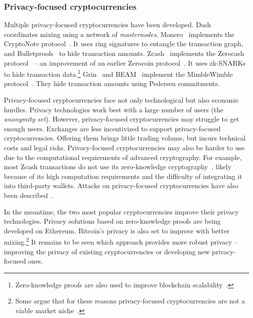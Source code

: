\subsubsection*{Privacy-focused cryptocurrencies}

Multiple privacy-focused cryptocurrencies have been developed.
Dash~\cite{Dash} coordinates mixing using a network of \textit{masternodes}.
Monero~\cite{Monero} implements the CryptoNote protocol~\cite{Saberhagen2013}.
It uses ring signatures to entangle the transaction graph, and Bulletproofs~\cite{Buenz2018} to hide transaction amounts.
Zcash~\cite{Zcash} implements the Zerocash protocol~\cite{BenSasson2014, Hopwood2020} -- an improvement of an earlier Zerocoin protocol~\cite{Miers2013}.
It uses zk-SNARKs~\cite{BenSasson2014a} to hide transaction data.\footnote{Zero-knowledge proofs are also used to improve blockchain scalability~\cite{Bonneau2020}.}
Grin~\cite{Grin} and BEAM~\cite{Beam} implement the MimbleWimble protocol~\cite{Jedusor2016}.
They hide transaction amounts using Pedersen commitments.

Privacy-focused cryptocurrencies face not only technological but also economic hurdles.
Privacy technologies work best with a large number of users (the \textit{anonymity set}).
However, privacy-focused cryptocurrencies may struggle to get enough users.
Exchanges are less incentivized to support privacy-focused cryptocurrencies.
Offering them brings little trading volume, but incurs technical costs and legal risks.
Privacy-focused cryptocurrencies may also be harder to use due to the computational requirements of advanced cryptography.
For example, most Zcash transactions do not use its zero-knowledge cryptography~\cite{Quesnelle2017, Biryukov2019c}, likely because of its high computation requirements and the difficulty of integrating it into third-party wallets.
Attacks on privacy-focused cryptocurrencies have also been described~\cite{Quesnelle2017, Moeser2018, Biryukov2019d, Biryukov2019e, Tramer2020}.

In the meantime, the two most popular cryptocurrencies improve their privacy technologies.
Privacy solutions based on zero-knowledge proofs are being developed on Ethereum.
Bitcoin's privacy is also set to improve with better mixing.\footnote{Some argue that for these reasons privacy-focused cryptocurrencies are not a viable market niche~\cite{Gentry2019}.}
It remains to be seen which approach provides more robust privacy -- improving the privacy of existing cryptocurrencies or developing new privacy-focused ones.



